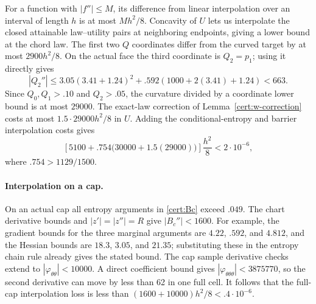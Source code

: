 For a function with $|f''|\leq M$, its difference from linear
interpolation over an interval of length $h$ is at most $Mh^2/8$.
Concavity of $U$ lets us interpolate the closed attainable law--utility
pairs at neighboring endpoints, giving a lower bound at the chord law.
The first two $Q$ coordinates differ from the curved target by at most
$2900h^2/8$.  On the actual face the third coordinate is $Q_2=p_1$;
using it directly gives
\[
 |Q_2''|\leq3.05(3.41+1.24)^2
            +.592(1000+2(3.41)+1.24)<663.
\]
Since $Q_0,Q_1>.10$ and $Q_2>.05$, the curvature divided by a coordinate
lower bound is at most $29000$.  The exact-law correction of
Lemma~\ref{cert:w-correction} costs at most $1.5\cdot29000h^2/8$ in $U$.
Adding the conditional-entropy
and barrier interpolation costs gives
\begin{equation}\label{cert:face-interpolation}
 \left[5100+.754\bigl(30000+1.5(29000)\bigr)\right]\frac{h^2}{8}
       <2\cdot10^{-6},
\end{equation}
where $.754>1129/1500$.

\paragraph{Interpolation on a cap.}
On an actual cap all entropy arguments in \eqref{cert:Bc} exceed $.049$.
The chart derivative bounds and $|z'|=|z''|=R$ give
$|B_c''|<1600$.  For example, the gradient bounds for the three marginal
arguments are $4.22$, $.592$, and $4.812$, and the Hessian bounds are
$18.3$, $3.05$, and $21.35$; substituting these in the entropy chain rule
already gives the stated bound.  The cap sample derivative checks extend
to $|\varphi_{\theta\theta}|<10000$.  A direct coefficient bound gives
$|\varphi_{\theta\theta\theta}|<3875770$, so the second derivative
can move by less than 62 in one full cell.  It follows that the full-cap
interpolation loss is less than
$(1600+10000)h^2/8<.4\cdot10^{-6}$.

